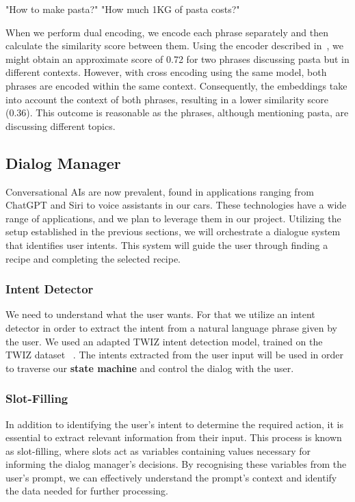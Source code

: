 \documentclass[runningheads]{llncs}
\begin{document}
\hspace{0.5cm} %
\begin{minipage}{1.2\textwidth} %
\begin{dialogue}
 "How to make pasta?"
 "How much 1KG of pasta costs?"\\[5pt]
\end{dialogue}
\end{minipage}

When we perform dual encoding, we encode each phrase separately and then calculate the similarity score between them. Using the encoder described in~\cite{reimers-2019-sentence-bert}, we might obtain an approximate score of 0.72 for two phrases discussing pasta but in different contexts. However, with cross encoding using the same model, both phrases are encoded within the same context. Consequently, the embeddings take into account the context of both phrases, resulting in a lower similarity score (0.36). This outcome is reasonable as the phrases, although mentioning pasta, are discussing different topics.
\subsection{Dialog Manager}
Conversational AIs are now prevalent, found in applications ranging from ChatGPT and Siri to voice assistants in our cars. These technologies have a wide range of applications, and we plan to leverage them in our project. Utilizing the setup established in the previous sections, we will orchestrate a dialogue system that identifies user intents. This system will guide the user through finding a recipe and completing the selected recipe.
\subsubsection{Intent Detector}
We need to understand what the user wants. For that we utilize an intent detector in order to extract the intent from a natural language phrase given by the user. We used an adapted TWIZ intent detection model, trained on the TWIZ dataset ~\cite{intentdetect}. The intents extracted from the user input will be used in order to traverse our \textbf{state machine} and control the dialog with the user.
\subsubsection{Slot-Filling}
In addition to identifying the user's intent to determine the required action, it is essential to extract relevant information from their input. This process is known as slot-filling, where slots act as variables containing values necessary for informing the dialog manager's decisions. By recognising these variables from the user's prompt, we can effectively understand the prompt's context and identify the data needed for further processing.
\end{document}
